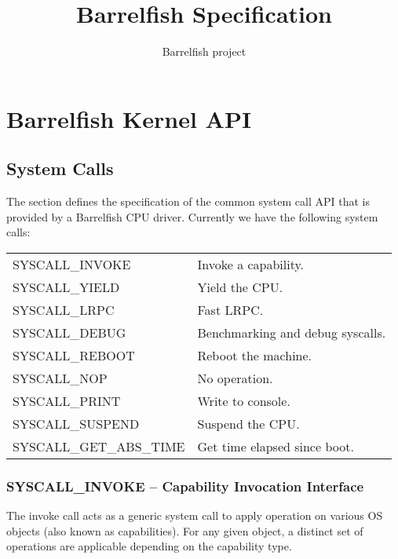 \documentclass[a4paper,11pt,twoside]{report}
\title{Barrelfish Specification}
\author{Barrelfish project}
\begin{document}
\maketitle

\begin{versionhistory}
\end{versionhistory}

\cleardoublepage
\tableofcontents

\chapter{Barrelfish Kernel API}

\section{System Calls}\label{sec:syscalls}

The section defines the specification of the common system call
API that is provided by a Barrelfish CPU driver. Currently
we have the following system calls:

\begin{tabular}{|p{5cm}|>{\raggedright\arraybackslash}p{7cm}|}
\hline

SYSCALL\_INVOKE & Invoke a capability. \\
SYSCALL\_YIELD & Yield the CPU. \\
SYSCALL\_LRPC & Fast LRPC. \\
SYSCALL\_DEBUG & Benchmarking and debug syscalls. \\
SYSCALL\_REBOOT & Reboot the machine. \\
SYSCALL\_NOP & No operation. \\
SYSCALL\_PRINT & Write to console. \\
SYSCALL\_SUSPEND & Suspend the CPU. \\
SYSCALL\_GET\_ABS\_TIME & Get time elapsed since boot. \\
\hline
\end{tabular}

\subsection{SYSCALL\_INVOKE -- Capability Invocation Interface}\label{sec:sys_invoke}

The invoke call acts as a generic system call to apply operation on various OS
objects (also known as capabilities). For any given object, a distinct set of
operations are applicable depending on the capability type.
\end{document}
